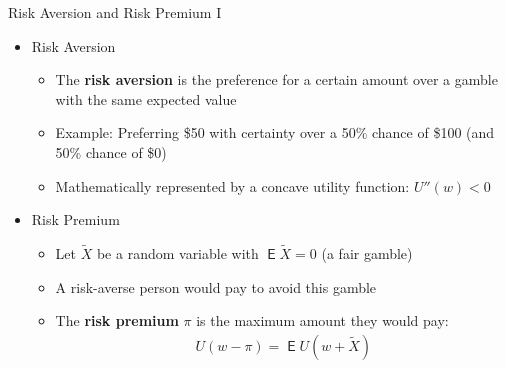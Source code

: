 \documentclass[10pt,handout]{beamer}
\DeclareMathOperator\expc{\mathsf{E}}
\begin{document}
\begin{frame}{Risk Aversion and Risk Premium I}
  \begin{itemize}[<+->]
    \item Risk Aversion
      \begin{itemize}
        \item The \textbf{risk aversion} is the preference for a certain amount over a gamble with the same expected value
        \item Example: Preferring \$50 with certainty over a 50\% chance of \$100 (and 50\% chance of \$0)
        \item Mathematically represented by a concave utility function: $U''(w) < 0$
      \end{itemize}
    \item Risk Premium 
      \begin{itemize}
        \item Let $\widetilde{X}$ be a random variable with $\expc{\widetilde{X}} = 0$ (a fair gamble)
        \item A risk-averse person would pay to avoid this gamble
        \item The \textbf{risk premium} $\pi$ is the maximum amount they would pay:
          \begin{align}\label{eq:risk_premium}
            U(w - \pi) = \expc{U(w + \widetilde{X})}
          \end{align}
      \end{itemize}
  \end{itemize}
\end{frame}
\end{document}
